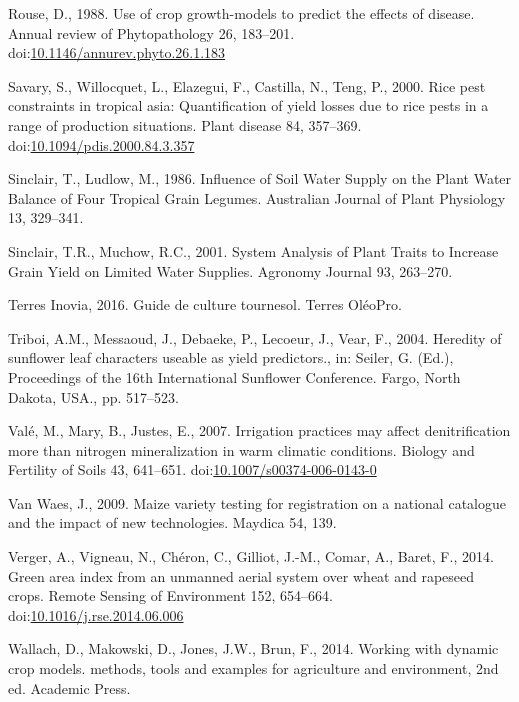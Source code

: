 \documentclass[a4paper]{article}
\begin{document}
\hypertarget{ref-Rouse1988}{}
Rouse, D., 1988. Use of crop growth-models to predict the effects of
disease. Annual review of Phytopathology 26, 183--201.
doi:\href{https://doi.org/10.1146/annurev.phyto.26.1.183}{10.1146/annurev.phyto.26.1.183}

\hypertarget{ref-Savary2000}{}
Savary, S., Willocquet, L., Elazegui, F., Castilla, N., Teng, P., 2000.
Rice pest constraints in tropical asia: Quantification of yield losses
due to rice pests in a range of production situations. Plant disease 84,
357--369.
doi:\href{https://doi.org/10.1094/pdis.2000.84.3.357}{10.1094/pdis.2000.84.3.357}

\hypertarget{ref-Sinclair1986a}{}
Sinclair, T., Ludlow, M., 1986. Influence of Soil Water Supply on the
Plant Water Balance of Four Tropical Grain Legumes. Australian Journal
of Plant Physiology 13, 329--341.

\hypertarget{ref-Sinclair2001}{}
Sinclair, T.R., Muchow, R.C., 2001. System Analysis of Plant Traits to
Increase Grain Yield on Limited Water Supplies. Agronomy Journal 93,
263--270.

\hypertarget{ref-TerresInovia2016}{}
Terres Inovia, 2016. Guide de culture tournesol. Terres OléoPro.

\hypertarget{ref-Triboi2004}{}
Triboi, A.M., Messaoud, J., Debaeke, P., Lecoeur, J., Vear, F., 2004.
Heredity of sunflower leaf characters useable as yield predictors., in:
Seiler, G. (Ed.), Proceedings of the 16th International Sunflower
Conference. Fargo, North Dakota, USA., pp. 517--523.

\hypertarget{ref-Vale2007}{}
Valé, M., Mary, B., Justes, E., 2007. Irrigation practices may affect
denitrification more than nitrogen mineralization in warm climatic
conditions. Biology and Fertility of Soils 43, 641--651.
doi:\href{https://doi.org/10.1007/s00374-006-0143-0}{10.1007/s00374-006-0143-0}

\hypertarget{ref-VanWaes2009}{}
Van Waes, J., 2009. Maize variety testing for registration on a national
catalogue and the impact of new technologies. Maydica 54, 139.

\hypertarget{ref-Verger2014}{}
Verger, A., Vigneau, N., Chéron, C., Gilliot, J.-M., Comar, A., Baret,
F., 2014. Green area index from an unmanned aerial system over wheat and
rapeseed crops. Remote Sensing of Environment 152, 654--664.
doi:\href{https://doi.org/10.1016/j.rse.2014.06.006}{10.1016/j.rse.2014.06.006}

\hypertarget{ref-Wallach2014}{}
Wallach, D., Makowski, D., Jones, J.W., Brun, F., 2014. Working with
dynamic crop models. methods, tools and examples for agriculture and
environment, 2nd ed. Academic Press.
\end{document}
